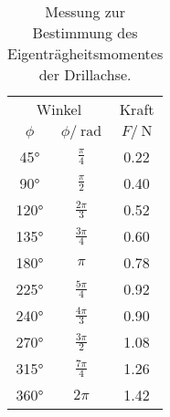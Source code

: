 \begin{table}
	\centering
	\def\arraystretch{1.3} 
	\begin{tabular}{ccc}
	\toprule
	\multicolumn{2}{c}{Winkel} & {Kraft} \\
	{$\phi$} & {$\phi/\:\text{rad}$} & {$F/\:\si{\newton}$} \\
	\midrule
 45$\text{°}$ & $\frac{\pi}{4}$   & 0.22 \\ 
 90$\text{°}$ & $\frac{\pi}{2}$   & 0.40 \\
120$\text{°}$ & $\frac{2\pi}{3}$  & 0.52 \\
135$\text{°}$ & $\frac{3\pi}{4}$  & 0.60 \\
180$\text{°}$ & $\pi$             & 0.78 \\
225$\text{°}$ & $\frac{5\pi}{4}$  & 0.92 \\
240$\text{°}$ & $\frac{4\pi}{3}$  & 0.90 \\
270$\text{°}$ & $\frac{3\pi}{2}$  & 1.08 \\
315$\text{°}$ & $\frac{7\pi}{4}$  & 1.26 \\
360$\text{°}$ & $2\pi$            & 1.42 \\
	\bottomrule
	\end{tabular}
	\label{tab:M1 I_D}
	\caption{Messung zur Bestimmung des Eigenträgheitsmomentes der Drillachse.}
\end{table}
